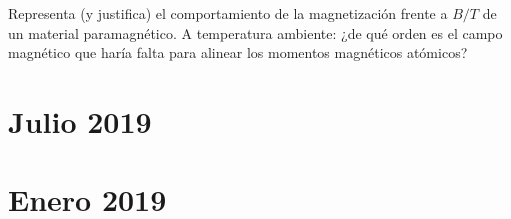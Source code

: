 \begin{ejercicio}
	Representa (y justifica) el comportamiento de la magnetización frente a $B/T$ de un material paramagnético. A temperatura ambiente: ¿de qué orden es el campo magnético que haría falta para alinear los momentos magnéticos atómicos?
\end{ejercicio}

\newpage


\section*{Julio 2019}
\setcounter{section}{4} %

\newpage

\section*{Enero 2019}
\setcounter{section}{5} %


